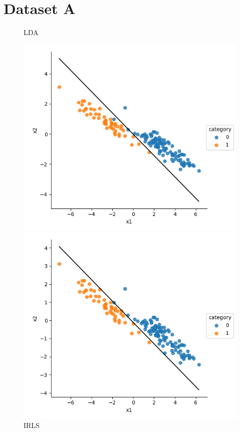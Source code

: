 \documentclass[a4paper]{article}
\begin{document}
\section{Dataset A}
\begin{figure}[h]
\centering
\begin{minipage}{0,45\textwidth}
\caption{LDA}
\includegraphics[scale=.5]{a_lda.png}
\end{minipage}
\begin{minipage}{0,45\textwidth}
\caption{IRLS}
\includegraphics[scale=.5]{a_irls.png}

\end{minipage}
\end{figure}
\end{document}

